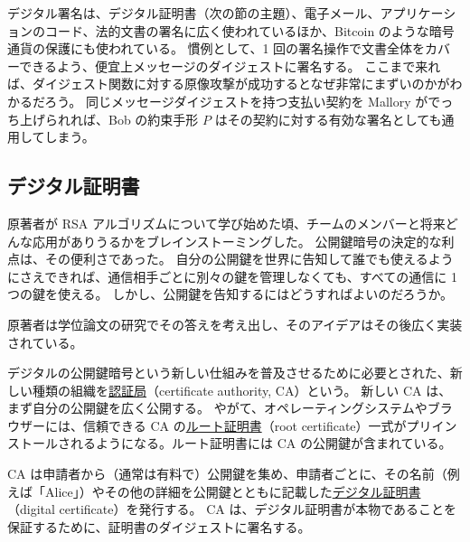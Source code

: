 \documentclass[uplatex]{jsarticle}
\def\label#1{}%
\begin{document}
デジタル署名は、デジタル証明書（次の節の主題）、電子メール、アプリケーションのコード、法的文書の署名に広く使われているほか、Bitcoin のような暗号通貨の保護にも使われている。
慣例として、1 回の署名操作で文書全体をカバーできるよう、便宜上メッセージのダイジェストに署名する。
ここまで来れば、ダイジェスト関数に対する原像攻撃が成功するとなぜ非常にまずいのかがわかるだろう。
同じメッセージダイジェストを持つ支払い契約を Mallory がでっち上げられれば、Bob の約束手形 $P$ はその契約に対する有効な署名としても通用してしまう。

\subsection{デジタル証明書}

原著者が RSA アルゴリズムについて学び始めた頃、チームのメンバーと将来どんな応用がありうるかをブレインストーミングした。
公開鍵暗号の決定的な利点は、その便利さであった。
自分の公開鍵を世界に告知して誰でも使えるようにさえできれば、通信相手ごとに別々の鍵を管理しなくても、すべての通信に 1 つの鍵を使える。
しかし、公開鍵を告知するにはどうすればよいのだろうか。

原著者は学位論文の研究でその答えを考え出し、そのアイデアはその後広く実装されている。

\begin{dfn}[認証局とルート証明書]\label{dfn:ch5-certificate-authority}
デジタルの公開鍵暗号という新しい仕組みを普及させるために必要とされた、新しい種類の組織を\underline{認証局}（certificate authority, CA）という。
新しい CA は、まず自分の公開鍵を広く公開する。
やがて、オペレーティングシステムやブラウザーには、信頼できる CA の\underline{ルート証明書}（root certificate）一式がプリインストールされるようになる。ルート証明書には CA の公開鍵が含まれている。
\end{dfn}

\begin{dfn}[デジタル証明書]\label{dfn:ch5-digital-certificate}
CA は申請者から（通常は有料で）公開鍵を集め、申請者ごとに、その名前（例えば「Alice」）やその他の詳細を公開鍵とともに記載した\underline{デジタル証明書}（digital certificate）を発行する。
CA は、デジタル証明書が本物であることを保証するために、証明書のダイジェストに署名する。
\end{dfn}
\end{document}
